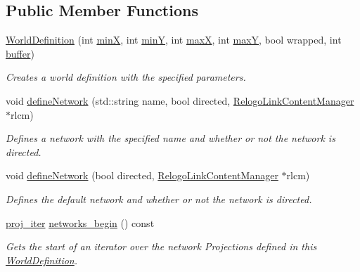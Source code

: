 \subsection*{Public Member Functions}
\begin{DoxyCompactItemize}
\item 
\hyperlink{classrepast_1_1relogo_1_1_world_definition_a6652b63cad8c22f1ad7aac7e5be87587}{World\-Definition} (int \hyperlink{classrepast_1_1relogo_1_1_world_definition_a952ccd4e18c655e3242bdc7d32e062d1}{min\-X}, int \hyperlink{classrepast_1_1relogo_1_1_world_definition_a225c0ad83e73e13e5e5a55226ffa1dbb}{min\-Y}, int \hyperlink{classrepast_1_1relogo_1_1_world_definition_a08eb3fa1fd9d6aed840f713d23b9ff48}{max\-X}, int \hyperlink{classrepast_1_1relogo_1_1_world_definition_a3395109e5074f8bacbbd0bb0fa36f089}{max\-Y}, bool wrapped, int \hyperlink{classrepast_1_1relogo_1_1_world_definition_aa02082d00b9badcf1e3894dbdc08b586}{buffer})
\begin{DoxyCompactList}\small\item\em Creates a world definition with the specified parameters. \end{DoxyCompactList}\item 
void \hyperlink{classrepast_1_1relogo_1_1_world_definition_af0dbe714030627a4274831f9bfe7f847}{define\-Network} (std\-::string name, bool directed, \hyperlink{classrepast_1_1relogo_1_1_relogo_link_content_manager}{Relogo\-Link\-Content\-Manager} $\ast$rlcm)
\begin{DoxyCompactList}\small\item\em Defines a network with the specified name and whether or not the network is directed. \end{DoxyCompactList}\item 
void \hyperlink{classrepast_1_1relogo_1_1_world_definition_a99d9ec41613be3c9ac9c9604b5030225}{define\-Network} (bool directed, \hyperlink{classrepast_1_1relogo_1_1_relogo_link_content_manager}{Relogo\-Link\-Content\-Manager} $\ast$rlcm)
\begin{DoxyCompactList}\small\item\em Defines the default network and whether or not the network is directed. \end{DoxyCompactList}\item 
\hyperlink{classrepast_1_1relogo_1_1_world_definition_ab1e044b19b6cb8c2e00110e48882afcc}{proj\-\_\-iter} \hyperlink{classrepast_1_1relogo_1_1_world_definition_a6e5b0f7af7876b41a5e5a8a69e43f615}{networks\-\_\-begin} () const 
\begin{DoxyCompactList}\small\item\em Gets the start of an iterator over the network Projections defined in this \hyperlink{classrepast_1_1relogo_1_1_world_definition}{World\-Definition}. \end{DoxyCompactList}\item 

\end{DoxyCompactItemize}
